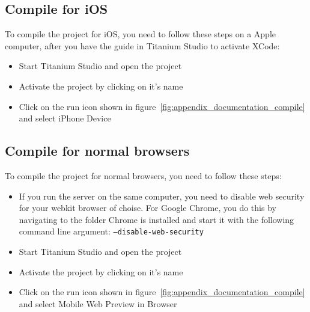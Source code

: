 \documentclass[11pt]{book}
\begin{document}
\subsection{Compile for iOS}
To compile the project for iOS, you need to follow these steps on a Apple computer, after you have the guide in Titanium Studio to activate XCode:

\begin{itemize}
    \item Start Titanium Studio and open the project
    \item Activate the project by clicking on it's name
    \item Click on the run icon shown in figure~\ref{fig:appendix_documentation_compile} and select iPhone Device
\end{itemize}

\subsection{Compile for normal browsers}
To compile the project for normal browsers, you need to follow these steps:

\begin{itemize}
    \item If you run the server on the same computer, you need to disable web security for your webkit browser of choise. For Google Chrome, you do this by navigating to the folder Chrome is installed and start it with the following command line argument: \texttt{--disable-web-security}
    \item Start Titanium Studio and open the project
    \item Activate the project by clicking on it's name
    \item Click on the run icon shown in figure~\ref{fig:appendix_documentation_compile} and select Mobile Web Preview in Browser
\end{itemize}
\end{document}
